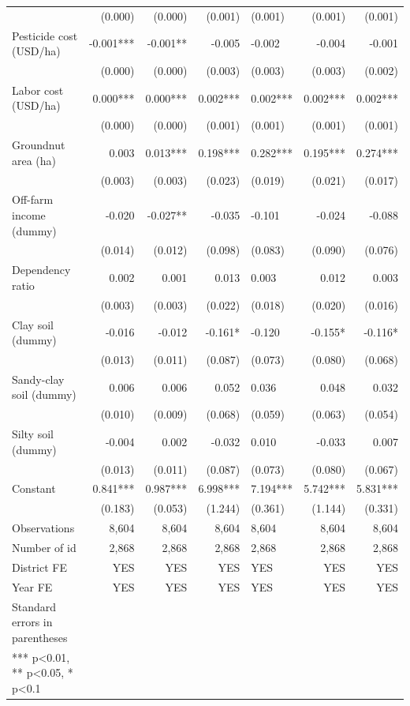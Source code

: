 \documentclass[
]{article}
\begin{document}
\begin{longtable}[t]{lrrrlrr}
 & (0.000) & (0.000) & (0.001) & (0.001) & (0.001) & (0.001)\\
Pesticide cost (USD/ha) & -0.001*** & -0.001** & -0.005 & -0.002 & -0.004 & -0.001\\
 & (0.000) & (0.000) & (0.003) & (0.003) & (0.003) & (0.002)\\
Labor cost (USD/ha) & 0.000*** & 0.000*** & 0.002*** & 0.002*** & 0.002*** & 0.002***\\
 & (0.000) & (0.000) & (0.001) & (0.001) & (0.001) & (0.001)\\
Groundnut area (ha) & 0.003 & 0.013*** & 0.198*** & 0.282*** & 0.195*** & 0.274***\\
 & (0.003) & (0.003) & (0.023) & (0.019) & (0.021) & (0.017)\\
Off-farm income (dummy) & -0.020 & -0.027** & -0.035 & -0.101 & -0.024 & -0.088\\
 & (0.014) & (0.012) & (0.098) & (0.083) & (0.090) & (0.076)\\
Dependency ratio & 0.002 & 0.001 & 0.013 & 0.003 & 0.012 & 0.003\\
 & (0.003) & (0.003) & (0.022) & (0.018) & (0.020) & (0.016)\\
Clay soil (dummy) & -0.016 & -0.012 & -0.161* & -0.120 & -0.155* & -0.116*\\
 & (0.013) & (0.011) & (0.087) & (0.073) & (0.080) & (0.068)\\
Sandy-clay soil (dummy) & 0.006 & 0.006 & 0.052 & 0.036 & 0.048 & 0.032\\
 & (0.010) & (0.009) & (0.068) & (0.059) & (0.063) & (0.054)\\
Silty soil (dummy) & -0.004 & 0.002 & -0.032 & 0.010 & -0.033 & 0.007\\
 & (0.013) & (0.011) & (0.087) & (0.073) & (0.080) & (0.067)\\
Constant & 0.841*** & 0.987*** & 6.998*** & 7.194*** & 5.742*** & 5.831***\\
 & (0.183) & (0.053) & (1.244) & (0.361) & (1.144) & (0.331)\\
Observations & 8,604 & 8,604 & 8,604 & 8,604 & 8,604 & 8,604\\
Number of id & 2,868 & 2,868 & 2,868 & 2,868 & 2,868 & 2,868\\
District FE & YES & YES & YES & YES & YES & YES\\
Year FE & YES & YES & YES & YES & YES & YES\\
Standard errors in parentheses &  &  &  &  &  & \\
*** p<0.01, ** p<0.05, * p<0.1 &  &  &  &  &  & \\*
\end{longtable}
\endgroup{}
\end{document}
